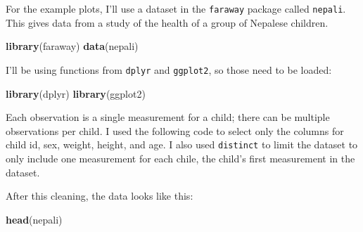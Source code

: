 \documentclass[]{book}
\makeatletter
\newenvironment{Shaded}{\begin{snugshade}}{\end{snugshade}}
\newcommand{\KeywordTok}[1]{\textcolor[rgb]{0.13,0.29,0.53}{\textbf{{#1}}}}
\newcommand{\DataTypeTok}[1]{\textcolor[rgb]{0.13,0.29,0.53}{{#1}}}
\newcommand{\DecValTok}[1]{\textcolor[rgb]{0.00,0.00,0.81}{{#1}}}
\newcommand{\StringTok}[1]{\textcolor[rgb]{0.31,0.60,0.02}{{#1}}}
\newcommand{\OtherTok}[1]{\textcolor[rgb]{0.56,0.35,0.01}{{#1}}}
\newcommand{\NormalTok}[1]{{#1}}
\newenvironment{kframe}{%
\medskip{}
\setlength{\fboxsep}{.8em}
 \def\at@end@of@kframe{}%
 \ifinner\ifhmode%
  \def\at@end@of@kframe{\end{minipage}}%
  \begin{minipage}{\columnwidth}%
 \fi\fi%
 \def\FrameCommand##1{\hskip\@totalleftmargin \hskip-\fboxsep
 \colorbox{shadecolor}{##1}\hskip-\fboxsep
     \hskip-\linewidth \hskip-\@totalleftmargin \hskip\columnwidth}%
 \MakeFramed {\advance\hsize-\width
   \@totalleftmargin\z@ \linewidth\hsize
   \@setminipage}}%
 {\par\unskip\endMakeFramed%
 \at@end@of@kframe}
\renewenvironment{Shaded}{\begin{kframe}}{\end{kframe}}
\makeatother
\begin{document}
For the example plots, I'll use a dataset in the \texttt{faraway}
package called \texttt{nepali}. This gives data from a study of the
health of a group of Nepalese children.

\begin{Shaded}
\begin{Highlighting}[]
\KeywordTok{library}\NormalTok{(faraway)}
\KeywordTok{data}\NormalTok{(nepali)}
\end{Highlighting}
\end{Shaded}

I'll be using functions from \texttt{dplyr} and \texttt{ggplot2}, so
those need to be loaded:

\begin{Shaded}
\begin{Highlighting}[]
\KeywordTok{library}\NormalTok{(dplyr)}
\KeywordTok{library}\NormalTok{(ggplot2)}
\end{Highlighting}
\end{Shaded}

Each observation is a single measurement for a child; there can be
multiple observations per child. I used the following code to select
only the columns for child id, sex, weight, height, and age. I also used
\texttt{distinct} to limit the dataset to only include one measurement
for each chile, the child's first measurement in the dataset.

\begin{Shaded}
\end{Shaded}

After this cleaning, the data looks like this:

\begin{Shaded}
\begin{Highlighting}[]
\KeywordTok{head}\NormalTok{(nepali)}
\end{Highlighting}
\end{Shaded}
\end{document}
